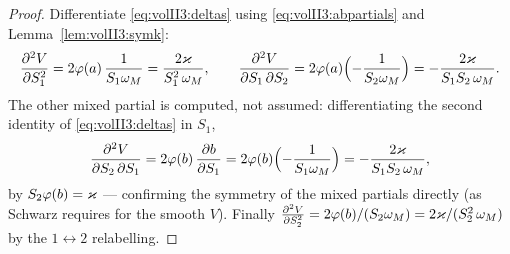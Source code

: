 \begin{proof}
Differentiate \eqref{eq:volII3:deltas} using \eqref{eq:volII3:abpartials} and
Lemma~\ref{lem:volII3:symk}:
\begin{equation}\label{eq:volII3:gamma11}
\frac{\partial^2 V}{\partial S_1^2} = 2\varphi(a)\,\frac{1}{S_1\omega_M} = \frac{2\varkappa}{S_1^2\,\omega_M},
\qquad
\frac{\partial^2 V}{\partial S_1\,\partial S_2} = 2\varphi(a)\Bigl(-\frac{1}{S_2\omega_M}\Bigr)
= -\frac{2\varkappa}{S_1 S_2\,\omega_M}.
\end{equation}
The other mixed partial is computed, not assumed: differentiating the second
identity of \eqref{eq:volII3:deltas} in $S_1$,
\begin{equation}\label{eq:volII3:gamma21}
\frac{\partial^2 V}{\partial S_2\,\partial S_1} = 2\varphi(b)\,\frac{\partial b}{\partial S_1}
= 2\varphi(b)\Bigl(-\frac{1}{S_1\omega_M}\Bigr)
= -\frac{2\varkappa}{S_1 S_2\,\omega_M},
\end{equation}
by $S_2\varphi(b) = \varkappa$ --- confirming the symmetry of the mixed partials
directly (as Schwarz requires for the smooth $V$). Finally
$\frac{\partial^2 V}{\partial S_2^2} = 2\varphi(b)/(S_2\omega_M) = 2\varkappa/(S_2^2\,\omega_M)$ by the
$1 \leftrightarrow 2$ relabelling.
\end{proof}

